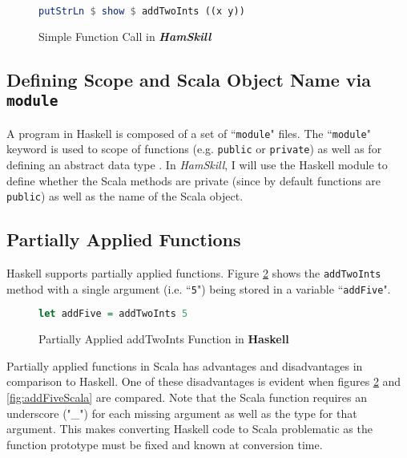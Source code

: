 \documentclass{report}
\begin{document}
\begin{figure}[H]
\begin{mdframed}
\begin{lstlisting}[language=Haskell]
putStrLn $ show $ addTwoInts ((x y))
\end{lstlisting}
\end{mdframed}
\caption{Simple Function Call in \textbf{\emph{HamSkill}}}\label{fig:addTwoNumbersHamSkill}
\end{figure}

\subsection{Defining Scope and Scala Object Name via {\tt module}}

A program in Haskell is composed of a set of ``{\tt module}" files.  The ``{\tt module}" keyword is used to  scope of functions (e.g. {\tt public} or {\tt private}) as well as for defining an abstract data type \cite{haskellModule}.  In \emph{HamSkill}, I will use the Haskell module to define whether the Scala methods are private (since by default functions are {\tt public}) as well as the name of the Scala object.

\subsection{Partially Applied Functions}\label{partiallyAppliedFunctions}

Haskell supports partially applied functions.  Figure \ref{fig:addFiveHaskell} shows the {\tt addTwoInts} method with a single argument (i.e. ``{\tt 5}") being stored in a variable ``{\tt addFive}".  

\begin{figure}[H]
\begin{mdframed}
\begin{lstlisting}[language=Haskell]
let addFive = addTwoInts 5
\end{lstlisting}
\end{mdframed}
\caption{Partially Applied addTwoInts Function in \textbf{Haskell}}\label{fig:addFiveHaskell}
\end{figure}

Partially applied functions in Scala has advantages and disadvantages in comparison to Haskell.  One of these disadvantages is evident when figures \ref{fig:addFiveHaskell} and \ref{fig:addFiveScala} are compared.  Note that the Scala function requires an underscore ("\_") for each missing argument as well as the type for that argument.  This makes converting Haskell code to Scala problematic as the function prototype must be fixed and known at conversion time.  
\end{document}
